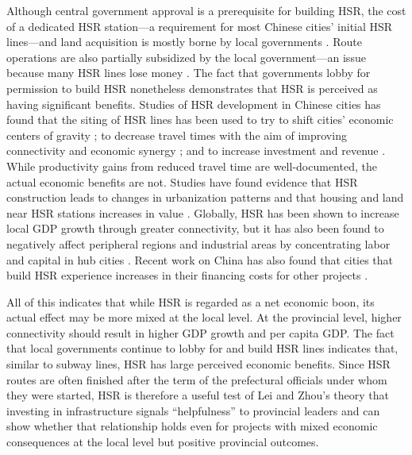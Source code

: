 \documentclass[12pt, ]{article}
\begin{document}
Although central government approval is a prerequisite for building HSR,
the cost of a dedicated HSR station---a requirement for most Chinese
cities' initial HSR lines---and land acquisition is mostly borne by
local governments
\citep{yang_wrestling_2020, yuan_peer_2023, wang_unravelling_2021}.
Route operations are also partially subsidized by the local
government---an issue because many HSR lines lose money
\citep{ma_localized_2022}. The fact that governments lobby for
permission to build HSR nonetheless demonstrates that HSR is perceived
as having significant benefits. Studies of HSR development in Chinese
cities has found that the siting of HSR lines has been used to try to
shift cities' economic centers of gravity
\citep{wang_planning_2022, chen_change_2021, zhu_does_2021, chi_impact_2023};
to decrease travel times with the aim of improving connectivity and
economic synergy
\citep{huang_intercity_2022, lawrence_chinas_2019, xu_planning_2014};
and to increase investment and revenue
\citep{wang_planning_2022, yang_wrestling_2020}. While productivity
gains from reduced travel time are well-documented, the actual economic
benefits are not. Studies have found evidence that HSR construction
leads to changes in urbanization patterns and that housing and land near
HSR stations increases in value
\citep{wang_planning_2022, yang_wrestling_2020}. Globally, HSR has been
shown to increase local GDP growth through greater connectivity, but it
has also been found to negatively affect peripheral regions and
industrial areas by concentrating labor and capital in hub cities
\citep{chi_impact_2023, zhu_does_2021}. Recent work on China has also
found that cities that build HSR experience increases in their financing
costs for other projects
\citep{ruan_high-speed_2023, yuan_chinas_2023, JianZhao2019}.

All of this indicates that while HSR is regarded as a net economic boon,
its actual effect may be more mixed at the local level. At the
provincial level, higher connectivity should result in higher GDP growth
and per capita GDP. The fact that local governments continue to lobby
for and build HSR lines indicates that, similar to subway lines, HSR has
large perceived economic benefits. Since HSR routes are often finished
after the term of the prefectural officials under whom they were
started, HSR is therefore a useful test of Lei and Zhou's theory that
investing in infrastructure signals ``helpfulness'' to provincial
leaders and can show whether that relationship holds even for projects
with mixed economic consequences at the local level but positive
provincial outcomes.
\end{document}
